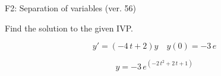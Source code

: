 \begin{exercise}
  \begin{exerciseTitle}F2: Separation of variables (ver. 56)\end{exerciseTitle}
  \begin{exerciseStatement}
    
Find the solution to the given IVP.

    
\[y'=( -4 \, t + 2 )y\hspace{1em} y(0)= -3 \, e\]

  \end{exerciseStatement}
  \begin{exerciseAnswer}
    
\[y= -3 \, e^{\left(-2 \, t^{2} + 2 \, t + 1\right)}\]

  \end{exerciseAnswer}
\end{exercise}